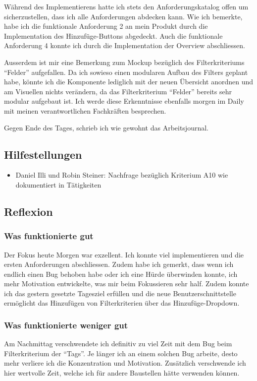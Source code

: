 Während des Implementierens hatte ich stets den Anforderungskatalog offen um sicherzustellen, dass ich alle Anforderungen abdecken kann.
Wie ich bemerkte, habe ich die funktionale Anforderung 2 an mein Produkt durch die Implementation des Hinzufüge-Buttons abgedeckt. Auch die funktionale Anforderung 4 konnte
ich durch die Implementation der Overview abschliessen. 

Ausserdem ist mir eine Bemerkung zum Mockup bezüglich des Filterkriteriums ``Felder'' aufgefallen. Da ich sowieso einen modularen Aufbau des Filters geplant habe, könnte ich die 
Komponente lediglich mit der neuen Übersicht anordnen und am Visuellen nichts verändern, da das Filterkriterium ``Felder'' bereits sehr modular aufgebaut ist. Ich werde diese Erkenntnisse ebenfalls
morgen im Daily mit meinen verantwortlichen Fachkräften besprechen. 

Gegen Ende des Tages, schrieb ich wie gewohnt das Arbeitsjournal.


\subsection*{Hilfestellungen}
\begin{itemize}
    \item Daniel Illi und Robin Steiner: Nachfrage bezüglich Kriterium A10 wie dokumentiert in Tätigkeiten
\end{itemize}

\subsection*{Reflexion}

\subsubsection*{Was funktionierte gut}
Der Fokus heute Morgen war exzellent. Ich konnte viel implementieren und die ersten Anforderungen abschliessen. 
Zudem habe ich gemerkt, dass wenn ich endlich einen Bug behoben habe oder ich eine Hürde überwinden konnte, ich mehr Motivation
entwickelte, was mir beim Fokussieren sehr half. Zudem konnte ich das gestern gesetzte Tagesziel erfüllen und die neue Benutzerschnittstelle ermöglicht das Hinzufügen
von Filterkriterien über das Hinzufüge-Dropdown.

\subsubsection*{Was funktionierte weniger gut}
Am Nachmittag verschwendete ich definitiv zu viel Zeit mit dem Bug beim Filterkriterium der ``Tags''. Je länger ich an einem solchen Bug arbeite, desto mehr
verliere ich die Konzentration und Motivation. Zusätzlich verschwende ich hier wertvolle Zeit, welche ich für andere Baustellen hätte verwenden können.


